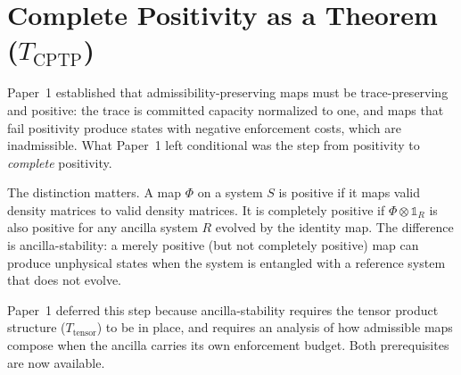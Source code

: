 \documentclass[11pt]{article}
\begin{document}
\section{Complete Positivity as a Theorem ($T_{\mathrm{CPTP}}$)}
\label{sec:cptp}

Paper~1 established that admissibility-preserving maps must be
trace-preserving and positive: the trace is committed capacity normalized to
one, and maps that fail positivity produce states with negative enforcement
costs, which are inadmissible.  What Paper~1 left conditional was the step
from positivity to \emph{complete} positivity.

The distinction matters.  A map $\Phi$ on a system $S$ is positive if it
maps valid density matrices to valid density matrices.  It is completely
positive if $\Phi\otimes\mathbb{1}_R$ is also positive for any ancilla system
$R$ evolved by the identity map.  The difference is ancilla-stability: a
merely positive (but not completely positive) map can produce unphysical
states when the system is entangled with a reference system that does not
evolve.

Paper~1 deferred this step because ancilla-stability requires the tensor
product structure ($T_{\mathrm{tensor}}$) to be in place, and requires an
analysis of how admissible maps compose when the ancilla carries its own
enforcement budget.  Both prerequisites are now available.
\end{document}
